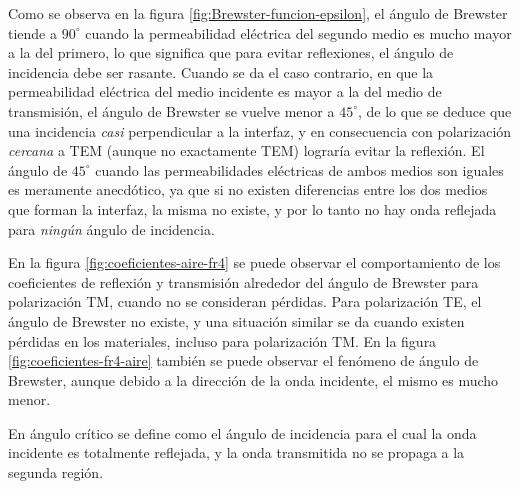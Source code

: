 Como se observa en la figura \ref{fig:Brewster-funcion-epsilon}, el ángulo de Brewster tiende a $90^{\circ}$ cuando la permeabilidad eléctrica del segundo medio es mucho mayor a la del primero, lo que significa que para evitar reflexiones, el ángulo de incidencia debe ser rasante. Cuando se da el caso contrario, en que la permeabilidad eléctrica del medio incidente es mayor a la del medio de transmisión, el ángulo de Brewster se vuelve menor a $45^{\circ}$, de lo que se deduce que una incidencia \textit{casi} perpendicular a la interfaz, y en consecuencia con polarización \textit{cercana} a TEM (aunque no exactamente TEM) lograría evitar la reflexión. El ángulo de $45^{\circ}$ cuando las permeabilidades eléctricas de ambos medios son iguales es meramente anecdótico, ya que si no existen diferencias entre los dos medios que forman la interfaz, la misma no existe, y por lo tanto no hay onda reflejada para \textit{ningún} ángulo de incidencia.

\begin{figure} [H]
	\centering 
	\caption{}
	\label{fig:angulo-critico-epsilon}
\end{figure}

En la figura  \ref{fig:coeficientes-aire-fr4} se puede observar el comportamiento de los coeficientes de reflexión y transmisión alrededor del ángulo de Brewster para polarización TM, cuando no se consideran pérdidas. Para polarización TE, el ángulo de Brewster no existe, y una situación similar se da cuando existen pérdidas en los materiales, incluso para polarización TM. En la figura \ref{fig:coeficientes-fr4-aire} también se puede observar el fenómeno de ángulo de Brewster, aunque debido a la dirección de la onda incidente, el mismo es mucho menor.


En ángulo crítico se define como el ángulo de incidencia para el cual la onda incidente es totalmente reflejada, y la onda transmitida no se propaga a la segunda región.

